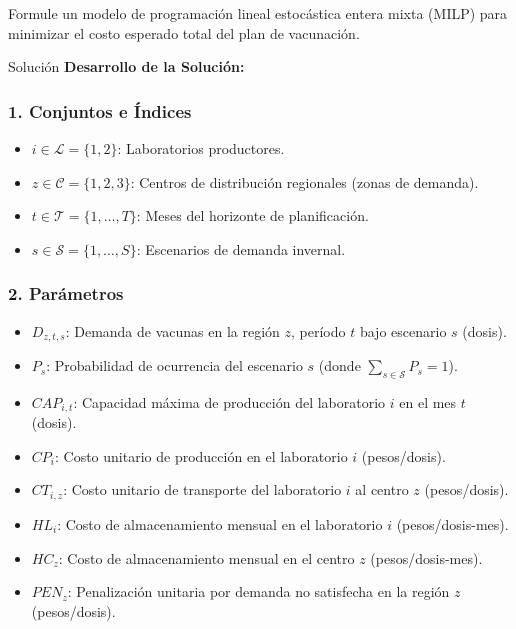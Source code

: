 \documentclass[11pt, a4paper]{article}
\begin{document}
  Formule un modelo de programación lineal estocástica entera mixta (MILP) para minimizar el costo esperado total del plan de vacunación.

  \medskip
  \begin{ejercicio}{Solución}
  \textbf{Desarrollo de la Solución:}

  \subsubsection*{1. Conjuntos e Índices}
  \begin{itemize}
    \item $i \in \mathcal{L} = \{1, 2\}$: Laboratorios productores.
    \item $z \in \mathcal{C} = \{1, 2, 3\}$: Centros de distribución regionales (zonas de demanda).
    \item $t \in \mathcal{T} = \{1, \dots, T\}$: Meses del horizonte de planificación.
    \item $s \in \mathcal{S} = \{1, \dots, S\}$: Escenarios de demanda invernal.
  \end{itemize}

  \subsubsection*{2. Parámetros}
  \begin{itemize}
    \item $D_{z,t,s}$: Demanda de vacunas en la región $z$, período $t$ bajo escenario $s$ (dosis).
    \item $P_s$: Probabilidad de ocurrencia del escenario $s$ (donde $\sum_{s \in \mathcal{S}} P_s = 1$).
    \item $CAP_{i,t}$: Capacidad máxima de producción del laboratorio $i$ en el mes $t$ (dosis).
    \item $CP_i$: Costo unitario de producción en el laboratorio $i$ (pesos/dosis).
    \item $CT_{i,z}$: Costo unitario de transporte del laboratorio $i$ al centro $z$ (pesos/dosis).
    \item $HL_i$: Costo de almacenamiento mensual en el laboratorio $i$ (pesos/dosis-mes).
    \item $HC_z$: Costo de almacenamiento mensual en el centro $z$ (pesos/dosis-mes).
    \item $PEN_z$: Penalización unitaria por demanda no satisfecha en la región $z$ (pesos/dosis).
  \end{itemize}


\end{ejercicio}
\end{document}

